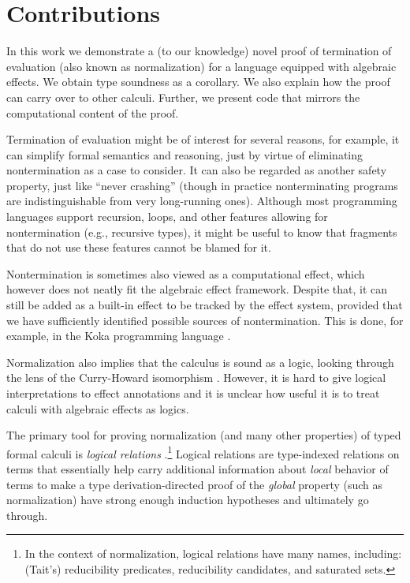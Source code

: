 \documentclass[a4paper, 11pt,titlepage, openright, twoside]{report}
\newcommand{\+}{\enspace}
\begin{document}
\section{Contributions}

In this work we demonstrate a (to our knowledge) novel proof of
termination of evaluation (also known as normalization) for a
language \cite{fscd19} equipped with algebraic effects.
We obtain type soundness as a corollary.
We also explain how the proof can carry over to other calculi.
Further, we present code that mirrors the computational content of the proof.

Termination of evaluation might be of interest for several reasons,
for example, it can simplify formal semantics and reasoning, just by virtue of
eliminating nontermination as a case to consider.
It can also be regarded as another safety property, just like ``never crashing''
(though in practice nonterminating programs are indistinguishable from {very long}-running ones).
Although most programming languages support recursion, loops, and other
features allowing for nontermination (e.g., recursive types),
it might be useful to know that fragments that do not use these features cannot be blamed
for it.

Nontermination is sometimes also viewed as a computational effect,
which however does not neatly fit the algebraic effect framework.
Despite that, it can still be added as a built-in effect to be tracked by
the effect system, provided that we have sufficiently identified possible sources
of nontermination.
This is done, for example, in the Koka programming language \cite{koka}.

Normalization also implies that the calculus is sound as a logic,
looking through the lens of the Curry-Howard isomorphism \cite{ch}.
However, it is hard to give logical interpretations to effect annotations \cite{oleg}
and it is unclear how useful it is to treat calculi with algebraic effects as logics.

The primary tool for proving normalization (and many other properties) of
typed formal calculi is {\em logical relations} \cite{lr}.\footnote{
	In the context of normalization, logical relations have many names, including:
	(Tait's) reducibility predicates, reducibility candidates, and saturated sets.
}
Logical relations are
type-indexed relations on terms that essentially help carry additional
information about {\em local} behavior of terms to make a type derivation-directed
proof of the {\em global} property (such as normalization)
have strong enough induction hypotheses and ultimately go through.
\end{document}
